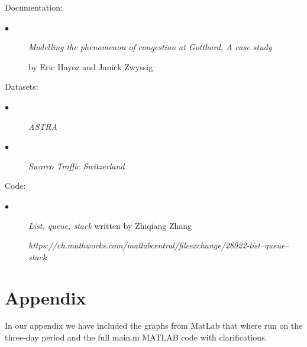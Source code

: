 \documentclass[11pt,a4paper,parskip=half-]{article}
\begin{document}
 Documentation: \par
 
\begin{description}
\item[$\bullet$ ] \textit 
{Modelling the phenomenon of congestion at Gotthard,
A case study} \par by Eric Hayoz and Janick Zwyssig

\end{description}

\vspace{5mm}

 Datasets: \par
 
 
\begin{description}
\item[$\bullet$ ] \textit 
{ASTRA} \par 

\item[$\bullet$ ] \textit {Swarco Traffic Switzerland}
\end{description}


\vspace{5mm}

Code: \par
 
 
\begin{description}
\item[$\bullet$ ] \textit 
 {List, queue, stack} written by Zhiqiang Zhang \par 
 \textit {https://ch.mathworks.com/matlabcentral/fileexchange/28922-list--queue--stack}
 

\end{description}








\clearpage

\section{Appendix}
In our appendix we have included the graphs from MatLab that where run on the three-day period and the full main.m MATLAB code with clarifications. 
\vspace{-1.5mm}
\end{document}
